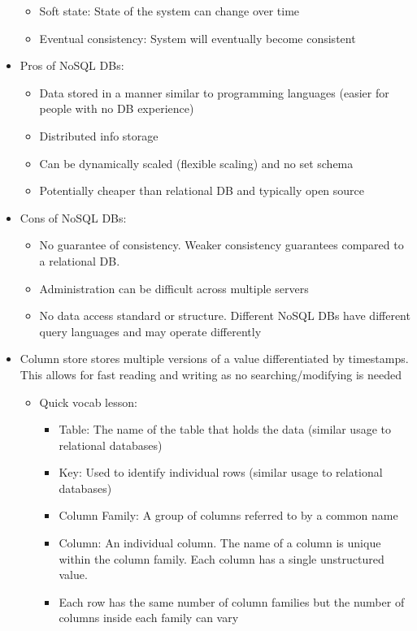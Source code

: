 \documentclass[8pt,landscape,a4paper, fleqn, dvipsnames]{extarticle}
\begin{document}
\begin{multicols*}{4}
\begin{itemize}
\begin{itemize}
        \item Soft state: State of the system can change over time
        \item Eventual consistency: System will eventually become consistent
    \end{itemize}
    \item Pros of NoSQL DBs:
    \begin{itemize}
        \item Data stored in a manner similar to programming languages (easier for people with no DB experience)
        \item Distributed info storage
        \item Can be dynamically scaled (flexible scaling) and no set schema
        \item Potentially cheaper than relational DB and typically open source
    \end{itemize}
    \item Cons of NoSQL DBs:
    \begin{itemize}
        \item No guarantee of consistency. Weaker consistency guarantees compared to a relational DB.
        \item Administration can be difficult across multiple servers
        \item No data access standard or structure. Different NoSQL DBs have different query languages and may operate differently
    \end{itemize}
    \item Column store stores multiple versions of a value differentiated by timestamps. This allows for fast reading and writing as no searching/modifying is needed
    \begin{itemize}
        \item Quick vocab lesson:
        \begin{itemize}
            \item Table: The name of the table that holds the data (similar usage to relational databases)
            \item Key: Used to identify individual rows (similar usage to relational databases)
            \item Column Family: A group of columns referred to by a common name
            \item Column: An individual column. The name of a column is unique within the column family. Each column has a single unstructured value.
            \item Each row has the same number of column families but the number of columns inside each family can vary

\end{itemize}
\end{itemize}
\end{itemize}
\end{multicols*}
\end{document}
